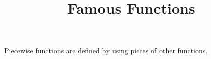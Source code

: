 \documentclass{ximera}
\title{Famous Functions}
\begin{document}
\begin{abstract}

\end{abstract}
\maketitle



Piecewise functions are defined by using pieces of other functions.
\end{document}
